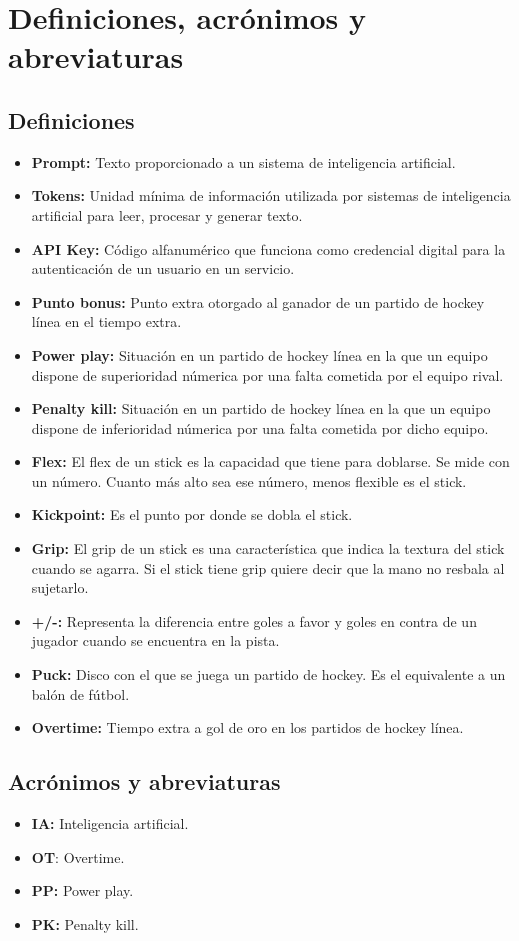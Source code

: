 \chapter{Definiciones, acrónimos y abreviaturas}

\section{Definiciones}

\begin{itemize}
  \item \textbf{Prompt:} Texto proporcionado a un sistema de inteligencia artificial.
  \item \textbf{Tokens:} Unidad mínima de información utilizada por sistemas de inteligencia artificial para leer, procesar y generar texto.
  \item \textbf{API Key:} Código alfanumérico que funciona como credencial digital para la autenticación de un usuario en un servicio.
  \item \textbf{Punto bonus:} Punto extra otorgado al ganador de un partido de hockey línea en el tiempo extra.
  \item \textbf{Power play:} Situación en un partido de hockey línea en la que un equipo dispone de superioridad númerica por una falta cometida por el equipo rival.
  \item \textbf{Penalty kill:} Situación en un partido de hockey línea en la que un equipo dispone de inferioridad númerica por una falta cometida por dicho equipo.
  \item \textbf{Flex:} El flex de un stick es la capacidad que tiene para doblarse. Se mide con un número. Cuanto más alto sea ese número, menos flexible es el stick.
  \item \textbf{Kickpoint:} Es el punto por donde se dobla el stick.
  \item \textbf{Grip:} El grip de un stick es una característica que indica la textura del stick cuando se agarra. Si el stick tiene grip quiere decir que la mano no resbala al sujetarlo.
  \item \textbf{+/-:} Representa la diferencia entre goles a favor y goles en contra de un jugador cuando se encuentra en la pista.
  \item \textbf{Puck:} Disco con el que se juega un partido de hockey. Es el equivalente a un balón de fútbol.
  \item \textbf{Overtime:} Tiempo extra a gol de oro en los partidos de hockey línea.
\end{itemize}

\section{Acrónimos y abreviaturas}

\begin{itemize}
  \item \textbf{IA:} Inteligencia artificial.
  \item \textbf{OT}: Overtime.
  \item \textbf{PP:} Power play.
  \item \textbf{PK:} Penalty kill.
\end{itemize}



